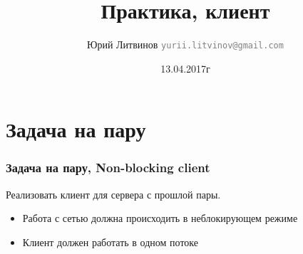 \documentclass[xetex,mathserif,serif]{beamer}
\title{Практика, клиент}
\author[Юрий Литвинов]{Юрий Литвинов \newline \textcolor{gray}{\small\texttt{yurii.litvinov@gmail.com}}}
\date{13.04.2017г}
\begin{document}
	
	\frame{\titlepage}
	
	\section{Задача на пару}

	\begin{frame}
		\frametitle{Задача на пару, Non-blocking client}
		Реализовать клиент для сервера с прошлой пары.
		\begin{itemize}
			\item Работа с сетью должна происходить в неблокирующем режиме
			\item Клиент должен работать в одном потоке
		\end{itemize}
	\end{frame}
\end{document}

